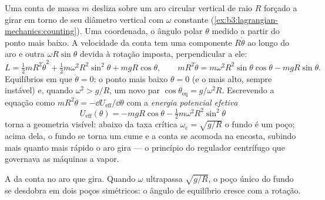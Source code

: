 \begin{example}\label{ex:b3:lagrangian-mechanics:hoop}
Uma conta de massa $m$ desliza sobre um aro circular vertical de raio
$R$ forçado a girar em torno de seu diâmetro vertical com $\omega$
constante (\cref{ex:b3:lagrangian-mechanics:counting}). Uma coordenada,
o ângulo polar $\theta$ medido a partir do ponto mais baixo. A
velocidade da conta tem uma componente $R\dot\theta$ ao longo do aro e
outra $\omega R\sin\theta$ devida à rotação imposta, perpendicular a
ele:
\[
L = \tfrac12 mR^2\dot\theta^2 + \tfrac12 m\omega^2R^2\sin^2\theta
 + mgR\cos\theta ,
\qquad
mR^2\ddot\theta = m\omega^2R^2\sin\theta\cos\theta - mgR\sin\theta .
\]
Equilíbrios em que $\ddot\theta = 0$: o ponto mais baixo $\theta = 0$
(e o mais alto, sempre instável) e, quando $\omega^2 > g/R$, um novo
par $\cos\theta_{\text{eq}} = g/\omega^2R$. Escrevendo a equação como
$mR^2\ddot\theta = -\dd U_{\text{eff}}/\dd\theta$ com a
\emph{energia potencial efetiva}
\[
U_{\text{eff}}(\theta) = -mgR\cos\theta
 - \tfrac12 m\omega^2R^2\sin^2\theta
\]
torna a geometria visível: abaixo da taxa crítica
$\omega_{\text{c}} = \sqrt{g/R}$ o fundo é um poço; acima dela, o fundo
se torna um cume e a conta se acomoda na encosta, subindo mais quanto
mais rápido o aro gira --- o princípio do regulador centrífugo que
governava as máquinas a vapor.
\end{example}

\begin{omfigure}

{\small A  da conta no aro que gira. Quando
$\omega$ ultrapassa $\sqrt{g/R}$, o poço único do fundo se desdobra em
dois poços simétricos: o ângulo de equilíbrio cresce com a rotação.}
\end{omfigure}

